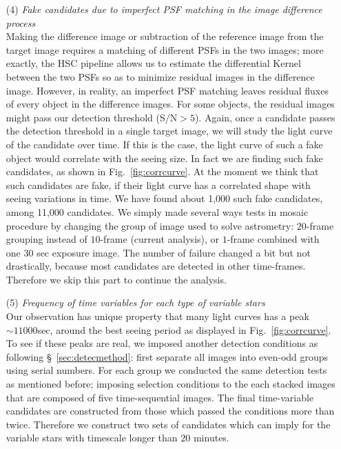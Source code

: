 \documentclass[iop, apj]{emulateapj}
\newcommand{\?}{\stackrel{?}{=}}
\begin{document}
\begin{itemize}
%
%
\item[(4)]{\it Fake candidates due to imperfect PSF matching in the image difference process}\\
\label{sec:unsolved}
Making the difference image or subtraction of the reference image from the target image requires a matching of different PSFs in the two images; more exactly, the HSC pipeline allows us to estimate the differential Kernel between the two PSFs so as to minimize residual images in the difference image. However, in reality, an imperfect PSF matching leaves residual fluxes of every object in the difference images. For some objects, the residual images might pass our detection threshold (S/N$>5$). Again, once a candidate passes the detection threshold in a single target image, we will study the light curve of the candidate over time. If this is the case, the light curve of such a fake object would correlate with the seeing size. In fact we are finding such fake candidates, as shown in Fig.~\ref{fig:corrcurve}. At the moment we think that such candidates are fake, if their light curve has a correlated shape with seeing variations in time. We have found about 1,000 such fake candidates, among 11,000 candidates. 
We simply made several ways tests in mosaic procedure by changing the group of image used to solve astrometry: $20$-frame grouping instead of $10$-frame (current analysis), or $1$-frame combined with one $30$ sec exposure image. 
The number of failure changed a bit but not drastically, because most candidates are detected in other time-frames. Therefore we skip this part to continue the analysis. 
%

\item[(5)]{\it Frequency of time variables for each type of variable stars}\\
\label{sec:sampling}
Our observation has unique property that many light curves has a peak $\sim11000$sec, around the best seeing period as displayed in Fig.~\ref{fig:corrcurve}. To see if these peaks are real, we imposed another detection conditions as following \S~\ref{sec:detecmethod}: first separate all images into even-odd groups using serial numbers. For each group we conducted the same detection tests as mentioned before; imposing selection conditions to the each stacked images that are composed of five time-sequential images. The final time-variable candidates are constructed from those which passed the conditions more than twice. Therefore we construct two sets of candidates which can imply for the variable stars with timescale longer than $20$ minutes. 


\end{itemize}
\end{document}
